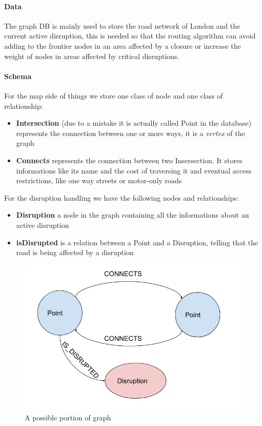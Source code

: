 \paragraph{Data} The graph DB is mainly used to store the road network of London and the current active disruption, this is needed so that the routing algorithm can avoid adding to the frontier nodes in an area affected by a closure or increase the weight of nodes in areas affected by critical disruptions.

\paragraph{Schema}For the map side of things we store one class of node and one class of relationship:

\begin{itemize}
	\item \textbf{Intersection }(due to a mistake it is actually called Point in the database) represents the connection between one or more ways, it is a \textit{vertex} of the graph
	\item \textbf{Connects} represents the connection between two Insersection. It stores informations like its name and the cost of traversing it and eventual access restrictions, like one way streets or motor-only roads
	
\end{itemize}

For the disruption handling we have the following nodes and relationships:

\begin{itemize}
	\item \textbf{Disruption} a node in the graph containing all the informations about an active disruption
	\item \textbf{isDisrupted} is a relation between a Point and a Disruption, telling that the road is being affected by a disruption

\end{itemize}
	
\begin{figure}[H]
	\centering
	\includegraphics[width=0.7\linewidth]{assets/schemaneo4j}
	\caption{A possible portion of graph}
	\label{fig:schemaneo4j}
\end{figure}

